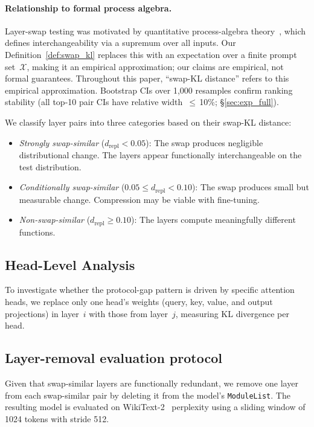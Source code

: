 \documentclass{article}
\begin{document}
\paragraph{Relationship to formal process algebra.}
Layer-swap testing was motivated by quantitative process-algebra theory~\citep{park1981concurrency,milner1989communication,desharnais2004metrics}, which defines interchangeability via a supremum over all inputs. Our Definition~\ref{def:swap_kl} replaces this with an expectation over a finite prompt set~$\mathcal{X}$, making it an empirical approximation; our claims are empirical, not formal guarantees. Throughout this paper, ``swap-KL distance'' refers to this empirical approximation. Bootstrap CIs over 1{,}000 resamples confirm ranking stability (all top-10 pair CIs have relative width~$\leq$\,10\%; \S\ref{sec:exp_full}).

We classify layer pairs into three categories based on their swap-KL distance:
\begin{itemize}
    \item \emph{Strongly swap-similar} ($d_{\text{repl}} < 0.05$): The swap produces negligible distributional change. The layers appear functionally interchangeable on the test distribution.
    \item \emph{Conditionally swap-similar} ($0.05 \leq d_{\text{repl}} < 0.10$): The swap produces small but measurable change. Compression may be viable with fine-tuning.
    \item \emph{Non-swap-similar} ($d_{\text{repl}} \geq 0.10$): The layers compute meaningfully different functions.
\end{itemize}

\subsection{Head-Level Analysis}
\label{sec:method_head}

To investigate whether the protocol-gap pattern is driven by specific attention heads, we replace only one head's weights (query, key, value, and output projections) in layer~$i$ with those from layer~$j$, measuring KL divergence per head.

\subsection{Layer-removal evaluation protocol}
\label{sec:method_skip}

Given that swap-similar layers are functionally redundant, we remove one layer from each swap-similar pair by deleting it from the model's \texttt{ModuleList}. The resulting model is evaluated on WikiText-2~\citep{merity2016pointer} perplexity using a sliding window of 1024 tokens with stride 512.
\end{document}
